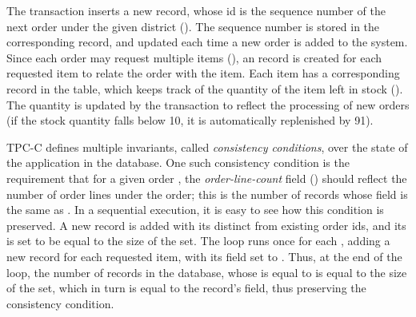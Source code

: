 The  transaction inserts a new  record, whose
id is the sequence number of the next order under the given district
(). The sequence number is stored in the corresponding
 record, and updated each time a new order is added to the
system. Since each order may request multiple items (),
an  record is created for each requested item to relate
the order with the item. Each item has a corresponding record in the
 table, which keeps track of the quantity of the item left in
stock (). The quantity is updated by the transaction to
reflect the processing of new orders (if the stock quantity falls below
10, it is automatically replenished by 91).

TPC-C defines multiple invariants, called \emph{consistency
conditions}, over the state of the application in the database. One
such consistency condition is the requirement that for a given order
, the \emph{order-line-count} field () should
reflect the number of order lines under the order; this is the number
of  records whose  field is the same as
.  In a sequential execution, it is easy to see how this
condition is preserved.  A new  record is added with its
 distinct from existing order ids, and its  is
set to be equal to the size of the  set. The 
loop runs once for each , adding a new 
record for each requested item, with its  field set to
. Thus, at the end of the loop, the number of 
records in the database, whose  is equal to  is
equal to the size of the  set, which in turn is equal to
the  record's  field, thus preserving the
consistency condition.

